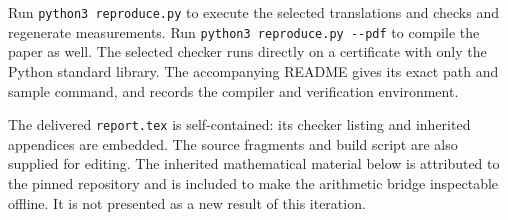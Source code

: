 \documentclass[11pt]{article}
\theoremstyle{definition}
\begin{document}
Run \verb|python3 reproduce.py| to execute the selected translations and
checks and regenerate measurements. Run
\verb|python3 reproduce.py --pdf| to compile the paper as well.
The selected checker runs directly on a certificate with only the Python
standard library. The accompanying README gives its exact path and sample
command, and records the compiler and verification environment.

The delivered \nolinkurl{report.tex} is self-contained: its checker listing
and inherited appendices are embedded. The source fragments and build
script are also supplied for editing. The inherited mathematical material
below is attributed to the pinned repository and is included to make the
arithmetic bridge inspectable offline. It is not presented as a new result
of this iteration.

\clearpage
\appendix
\end{document}
